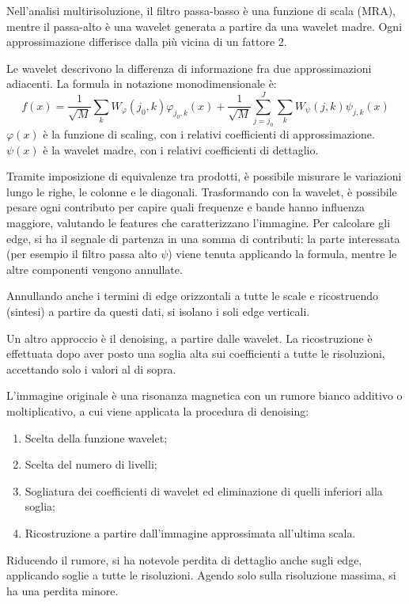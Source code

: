 Nell'analisi multirisoluzione, il filtro passa-basso è una funzione di scala (MRA), mentre il passa-alto è una wavelet generata a partire da una wavelet madre. Ogni approssimazione differisce dalla più vicina di un fattore 2.

Le wavelet descrivono la differenza di informazione fra due approssimazioni adiacenti. La formula in notazione monodimensionale è:
$$f(x)  = \frac{1}{\sqrt{M}} \sum_{k} W_\varphi (j_0, k) \varphi_{j_0, k} (x) + \frac{1}{\sqrt{M}} \sum_{j=j_0}^{J}\sum_{k} W_\psi(j, k)\psi_{j, k}(x)$$
$\varphi(x)$ è la funzione di scaling, con i relativi coefficienti di approssimazione. $\psi(x)$ è la wavelet madre, con i relativi coefficienti di dettaglio.

Tramite imposizione di equivalenze tra prodotti, è possibile misurare le variazioni lungo le righe, le colonne e le diagonali. Trasformando con la wavelet, è possibile pesare ogni contributo per capire quali frequenze e bande hanno influenza maggiore, valutando le features che caratterizzano l'immagine. 
Per calcolare gli edge, si ha il segnale di partenza in una somma di contributi: la parte interessata (per esempio il filtro passa alto $\psi$) viene tenuta applicando la formula, mentre le altre componenti vengono annullate. 

Annullando anche i termini di edge orizzontali a tutte le scale e ricostruendo (sintesi) a partire da questi dati, si isolano i soli edge verticali.

Un altro approccio è il denoising, a partire dalle wavelet. La ricostruzione è effettuata dopo aver posto una soglia alta sui coefficienti a tutte le risoluzioni, accettando solo i valori al di sopra. 

L'immagine originale è una risonanza magnetica con un rumore bianco additivo o moltiplicativo, a cui viene applicata la procedura di denoising:
\begin{enumerate}
	\item Scelta della funzione wavelet;
	\item Scelta del numero di livelli;
	\item Sogliatura dei coefficienti di wavelet ed eliminazione di quelli inferiori alla soglia;
	\item Ricostruzione a partire dall'immagine approssimata all'ultima scala.
\end{enumerate}

Riducendo il rumore, si ha notevole perdita di dettaglio anche sugli edge, applicando soglie a tutte le risoluzioni. Agendo solo sulla risoluzione massima, si ha una perdita minore.

